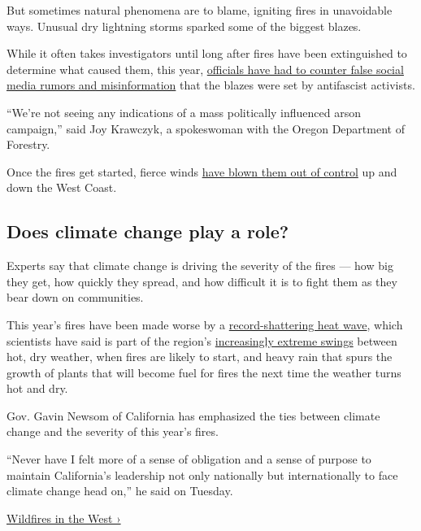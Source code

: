 But sometimes natural phenomena are to blame, igniting fires in
unavoidable ways. Unusual dry lightning storms sparked some of the
biggest blazes.

While it often takes investigators until long after fires have been
extinguished to determine what caused them, this year,
\href{https://www.nytimes3xbfgragh.onion/2020/09/10/us/antifa-wildfires.html?}{officials
have had to counter false social media rumors and misinformation} that
the blazes were set by antifascist activists.

``We're not seeing any indications of a mass politically influenced
arson campaign,'' said Joy Krawczyk, a spokeswoman with the Oregon
Department of Forestry.

Once the fires get started, fierce winds
\href{https://www.nytimes3xbfgragh.onion/2020/09/09/us/wildfires-live-updates.html?\#link-54181b61}{have
blown them out of control} up and down the West Coast.

\hypertarget{does-climate-change-play-a-role}{%
\subsection{Does climate change play a
role?}\label{does-climate-change-play-a-role}}

Experts say that climate change is driving the severity of the fires ---
how big they get, how quickly they spread, and how difficult it is to
fight them as they bear down on communities.

This year's fires have been made worse by a
\href{https://www.nytimes3xbfgragh.onion/2020/09/04/us/california-heat-wave.html?}{record-shattering
heat wave}, which scientists have said is part of the region's
\href{https://www.nytimes3xbfgragh.onion/2019/03/01/us/california-today-extreme-weather-forecast.html}{increasingly
extreme swings} between hot, dry weather, when fires are likely to
start, and heavy rain that spurs the growth of plants that will become
fuel for fires the next time the weather turns hot and dry.

Gov. Gavin Newsom of California has emphasized the ties between climate
change and the severity of this year's fires.

``Never have I felt more of a sense of obligation and a sense of purpose
to maintain California's leadership not only nationally but
internationally to face climate change head on,'' he said on Tuesday.

\href{https://www.nytimes3xbfgragh.onion/spotlight/california-wildfires}{Wildfires
in the West ›}

